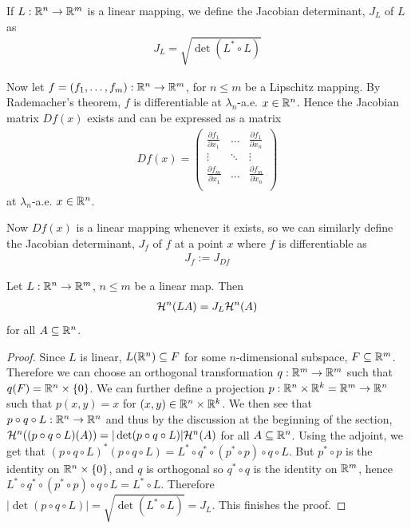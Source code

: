 If $L: \mathbb{R}^n \to \mathbb{R}^m$ is a linear mapping, we define the Jacobian determinant, $J_L$ of $L$ as
\begin{align*}
    J_L=\sqrt{\det(L^* \circ L)}
\end{align*}

Now let $f=(f_1, \dots, f_m):\mathbb{R}^n \to \mathbb{R}^m$, for $n \le m$ be a Lipschitz mapping. By Rademacher's theorem, $f$ is differentiable at $\lambda_n$-a.e. $x \in \mathbb{R}^n$. Hence the Jacobian matrix $Df(x)$ exists and can be expressed as a matrix
\begin{align*}
    Df(x) = \begin{pmatrix}
        \frac{\partial f_1}{\partial x_1} & \dots & \frac{\partial f_1}{\partial x_n} \\
        \vdots & \ddots & \vdots \\
        \frac{\partial f_m}{\partial x_1} & \dots & \frac{\partial f_m}{\partial x_n} \\
    \end{pmatrix}
\end{align*}
at $\lambda_n$-a.e. $x \in \mathbb{R}^n$.

Now $Df(x)$ is a linear mapping whenever it exists, so we can similarly define the Jacobian determinant, $J_f$ of $f$ at a point $x$ where $f$ is differentiable as
\begin{align*}
    J_f:=J_{Df}
\end{align*}

\begin{lemma}
Let $L:\mathbb{R}^n \to \mathbb{R}^m$, $n \le m$ be a linear map. Then
\begin{align*}
    \mathcal{H}^n(LA)=J_L\mathcal{H}^n(A)
\end{align*}
for all $A \subseteq \mathbb{R}^n$.
\end{lemma}
\begin{proof}
Since $L$ is linear, $L(\mathbb{R}^n) \subseteq F$ for some $n$-dimensional subspace, $F \subseteq \mathbb{R}^m$. Therefore we can choose an orthogonal transformation $q:\mathbb{R}^m \to \mathbb{R}^m$ such that $q(F)=\mathbb{R}^n \times \{0\}$. We can further define a projection $p:\mathbb{R}^n\times \mathbb{R}^k =\mathbb{R}^m \to \mathbb{R}^n$ such that $p(x,y)=x$ for $(x,y) \in \mathbb{R}^n \times \mathbb{R}^k$. We then see that $p \circ q \circ L:\mathbb{R}^n \to \mathbb{R}^n$ and thus by the discussion at the beginning of the section, $\mathcal{H}^n((p\circ q \circ L)(A))=|\det(p \circ q \circ L)|\mathcal{H}^n(A)$ for all $A \subseteq \mathbb{R}^n$. Using the adjoint, we get that $(p\circ q \circ L)^*(p\circ q \circ L)=L^*\circ q^* \circ (p^* \circ p) \circ q \circ L$. But $p^* \circ p$ is the identity on $\mathbb{R}^n \times \{0\}$, and $q$ is orthogonal so $q^* \circ q$ is the identity on $\mathbb{R}^m$, hence $L^*\circ q^* \circ (p^* \circ p) \circ q \circ L=L^* \circ L$. Therefore $|\det(p \circ q \circ L)|=\sqrt{\det (L^* \circ L)}=J_L$. This finishes the proof.
\end{proof}

